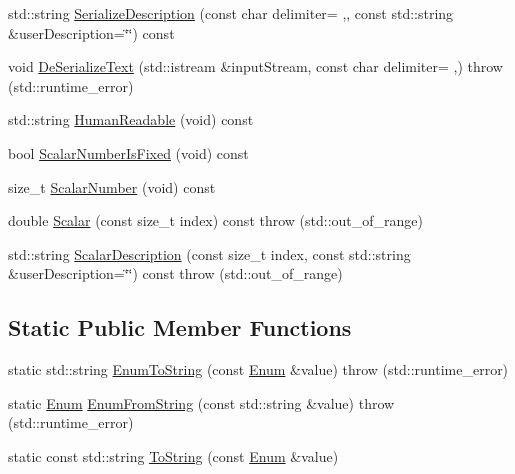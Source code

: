 \begin{DoxyCompactItemize}
\item 
std\+::string \hyperlink{classmts_execution_result_a86f2f2d55405d3f0757c73cc0ce357bc}{Serialize\+Description} (const char delimiter= \textquotesingle{},\textquotesingle{}, const std\+::string \&user\+Description=\char`\"{}\char`\"{}) const 
\item 
void \hyperlink{classmts_execution_result_a77d1ac94cc196622ca7ccdd18f94a325}{De\+Serialize\+Text} (std\+::istream \&input\+Stream, const char delimiter= \textquotesingle{},\textquotesingle{})  throw (std\+::runtime\+\_\+error)
\item 
std\+::string \hyperlink{classmts_execution_result_a7da5643e1f3d0c7f3d2005f0a02cd949}{Human\+Readable} (void) const 
\item 
bool \hyperlink{classmts_execution_result_a9d85e84986980f0cc17ca1b21238ddc7}{Scalar\+Number\+Is\+Fixed} (void) const 
\item 
size\+\_\+t \hyperlink{classmts_execution_result_a0d358fff33fc164bb66f8b55466148aa}{Scalar\+Number} (void) const 
\item 
double \hyperlink{classmts_execution_result_adfb34190b3ade19b642bfa7e836c4fc1}{Scalar} (const size\+\_\+t index) const   throw (std\+::out\+\_\+of\+\_\+range)
\item 
std\+::string \hyperlink{classmts_execution_result_a47b0cd05aa5033e1fe1283dc9d07a38a}{Scalar\+Description} (const size\+\_\+t index, const std\+::string \&user\+Description=\char`\"{}\char`\"{}) const   throw (std\+::out\+\_\+of\+\_\+range)
\end{DoxyCompactItemize}
\subsection*{Static Public Member Functions}
\begin{DoxyCompactItemize}
\item 
static std\+::string \hyperlink{classmts_execution_result_a762299c8990bcf0a3bead93bce52fb3f}{Enum\+To\+String} (const \hyperlink{classmts_execution_result_a10c4246c82ac99d88e5f716f79407b77}{Enum} \&value)  throw (std\+::runtime\+\_\+error)
\item 
static \hyperlink{classmts_execution_result_a10c4246c82ac99d88e5f716f79407b77}{Enum} \hyperlink{classmts_execution_result_a57ae921040a5ce5f378828998452e41c}{Enum\+From\+String} (const std\+::string \&value)  throw (std\+::runtime\+\_\+error)
\item 
static const std\+::string \hyperlink{classmts_execution_result_a3144e8062681b756fa5f55449d02ae33}{To\+String} (const \hyperlink{classmts_execution_result_a10c4246c82ac99d88e5f716f79407b77}{Enum} \&value)
\end{DoxyCompactItemize}
